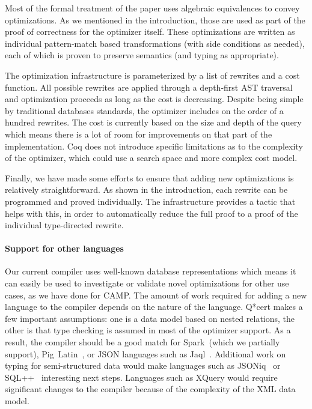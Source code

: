 Most of the formal treatment of the paper uses algebraic equivalences
to convey optimizations. As we mentioned in the introduction, those
are used as part of the proof of correctness for the optimizer
itself. These optimizations are written as individual pattern-match
based transformations (with side conditions as needed), each of which
is proven to preserve semantics (and typing as appropriate).

The optimization infrastructure is parameterized by a list of rewrites
and a cost function. All possible rewrites are applied through a
depth-first AST traversal and optimization proceeds as long as the
cost is decreasing.
%
Despite being simple by traditional databases standards, the optimizer
includes on the order of a hundred rewrites. The cost is currently
based on the size and depth of the query which means there is a lot of
room for improvements on that part of the implementation. Coq does not
introduce specific limitations as to the complexity of the optimizer,
which could use a search space and more complex cost model.

Finally, we have made some efforts to ensure that adding new
optimizations is relatively straightforward. As shown in the
introduction, each rewrite can be programmed and proved individually.
The infrastructure provides a tactic that helps with this, in order to
automatically reduce the full proof to a proof of the individual
type-directed rewrite.

\paragraph*{Support for other languages}

Our current compiler uses well-known database representations which
means it can easily be used to investigate or validate novel
optimizations for other use cases, as we have done for CAMP. The
amount of work required for adding a new language to the compiler
depends on the nature of the language. Q*cert makes a few important
assumptions: one is a data model based on nested relations, the other
is that type checking is assumed in most of the optimizer support. As
a result, the compiler should be a good match for Spark~(which we
partially support), Pig~Latin~\cite{OlstonRSKT08}, or JSON languages
such as Jaql~\cite{BeyerEGBEKOS11-full}. Additional work on typing for
semi-structured data would make languages such as
JSONiq~\cite{florescu2013jsoniq} or SQL++~\cite{OngPV14} interesting
next steps. Languages such as XQuery would require significant changes
to the compiler because of the complexity of the XML data model.


